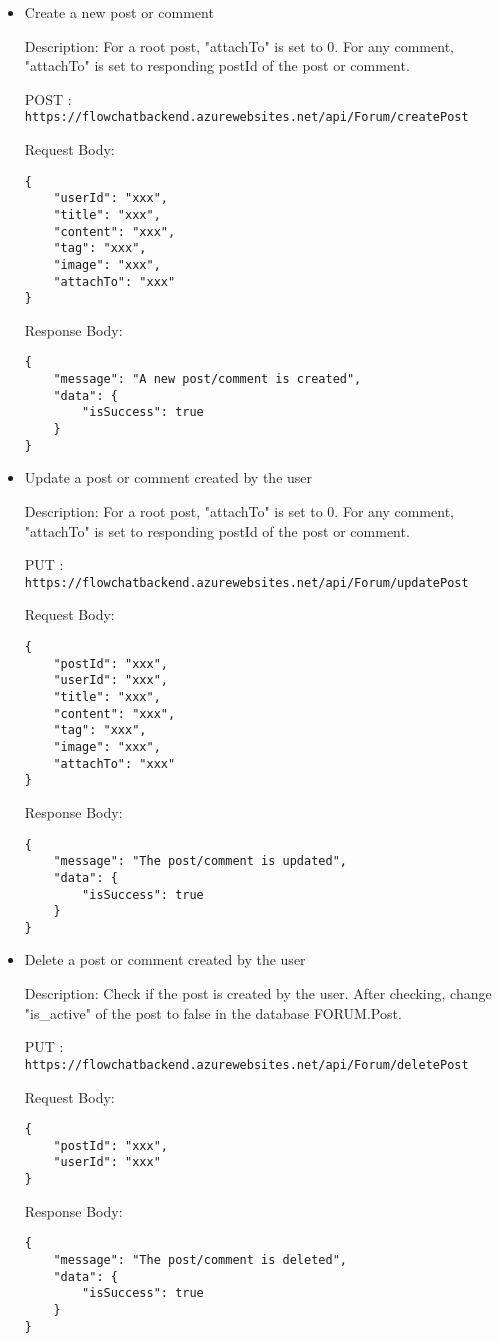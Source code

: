 \documentclass[11pt, a4paper]{article}
\begin{document}
\begin{itemize}
\item Create a new post or comment

Description: For a root post, "attachTo" is set to 0. For any comment, "attachTo" is set to responding postId of the post or comment.

POST :  \texttt{https://flowchatbackend.azurewebsites.net/api/Forum/createPost}
    
Request Body:
    \begin{lstlisting}[breaklines=true, frame=single]
{
    "userId": "xxx",
    "title": "xxx",
    "content": "xxx",
    "tag": "xxx",
    "image": "xxx",
    "attachTo": "xxx"
}
    \end{lstlisting}

    Response Body:
    \begin{lstlisting}[breaklines=true, frame=single]
{
    "message": "A new post/comment is created",
    "data": {
        "isSuccess": true
    }
}
    \end{lstlisting}

\item Update a post or comment created by the user

Description: For a root post, "attachTo" is set to 0. For any comment, "attachTo" is set to responding postId of the post or comment.

PUT :  \texttt{https://flowchatbackend.azurewebsites.net/api/Forum/updatePost}
    
Request Body:
    \begin{lstlisting}[breaklines=true, frame=single]
{
    "postId": "xxx",
    "userId": "xxx",
    "title": "xxx",
    "content": "xxx",
    "tag": "xxx",
    "image": "xxx",
    "attachTo": "xxx"
}
    \end{lstlisting}

    Response Body:
    \begin{lstlisting}[breaklines=true, frame=single]
{
    "message": "The post/comment is updated",
    "data": {
        "isSuccess": true
    }
}
    \end{lstlisting}

\item Delete a post or comment created by the user

Description: Check if the post is created by the user. After checking, change "is\_active" of the post to false in the database FORUM.Post.

PUT :  \texttt{https://flowchatbackend.azurewebsites.net/api/Forum/deletePost}
    
Request Body:
    \begin{lstlisting}[breaklines=true, frame=single]
{
    "postId": "xxx",
    "userId": "xxx"
}
    \end{lstlisting}

    Response Body:
    \begin{lstlisting}[breaklines=true, frame=single]
{
    "message": "The post/comment is deleted",
    "data": {
        "isSuccess": true
    }
}
    \end{lstlisting}

\end{itemize}
\end{document}
